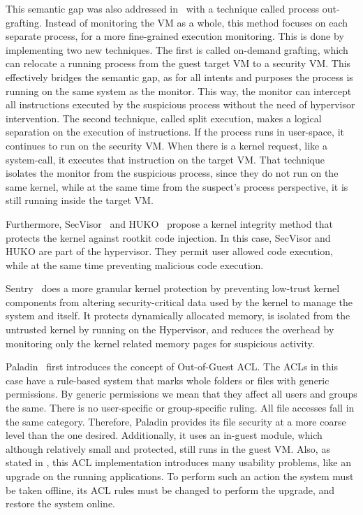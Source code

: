 \par This semantic gap was also addressed in~\cite{srinivasan2011process} with a technique called process out-grafting. Instead of monitoring the \ac{VM} as a whole, this method focuses on each separate process, for a more fine-grained execution monitoring. This is done by implementing two new techniques. The first is called on-demand grafting, which can relocate a running process from the guest target \ac{VM} to a security \ac{VM}. This effectively bridges the semantic gap, as for all intents and purposes the process is running on the same system as the monitor. This way, the monitor can intercept all instructions executed by the suspicious process without the need of hypervisor intervention. The second technique, called split execution, makes a logical separation on the execution of instructions. If the process runs in user-space, it continues to run on the security \ac{VM}. When there is a kernel request, like a system-call, it executes that instruction on the target \ac{VM}. That technique isolates the monitor from the suspicious process, since they do not run on the same kernel, while at the same time from the suspect’s process perspective, it is still running inside the target \ac{VM}. 

\par Furthermore, SecVisor~\cite{seshadri2007secvisor} and HUKO~\cite{xiong2011practical} propose a kernel integrity method that protects the kernel against rootkit code injection. In this case, SecVisor and HUKO are part of the hypervisor. They permit user allowed code execution, while at the same time preventing malicious code execution.


\par Sentry~\cite{srivastava2012efficient} does a more granular kernel protection by preventing low-trust kernel components from altering security-critical data used by the kernel to manage the system and itself. It protects dynamically allocated memory, is isolated from the untrusted kernel by running on the Hypervisor, and reduces the overhead by monitoring only the kernel related memory pages for suspicious activity.


\par Paladin~\cite{baliga2008automated} first introduces the concept of Out-of-Guest \ac{ACL}. The \acp{ACL} in this case have a rule-based system that marks whole folders or files with generic permissions. By generic permissions we mean that they affect all users and groups the same. There is no user-specific or group-specific ruling. All file accesses fall in the same category. Therefore, Paladin provides its file security at a more coarse level than the one desired. Additionally, it uses an in-guest module, which although relatively small and protected, still runs in the guest \ac{VM}. Also, as stated in \cite{baliga2008automated}, this \ac{ACL} implementation introduces many usability problems, like an upgrade on the running applications. To perform such an action the system must be taken offline, its \ac{ACL} rules must be changed to perform the upgrade, and restore the system online. 

